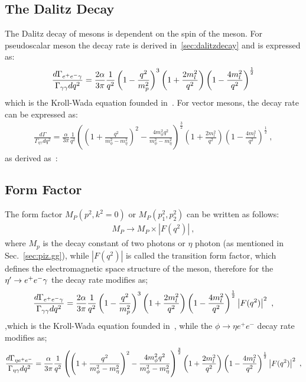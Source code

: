   \subsection{The Dalitz Decay}
  The Dalitz decay of mesons is dependent on the spin of the meson. For pseudoscalar meson the decay rate is derived in~\ref{sec:dalitzdecay} and is expressed as:
  \begin{align}\label{eq:eegff.finalkroll}
  \frac{d\Gamma_{e^+e^- \gamma}}{\Gamma_{\gamma\gamma} dq^2} = \frac{2 \alpha}{3 \pi} \frac{1}{q^2} \left( 1- \frac{q^2}{m_p^2}\right)^3 \left( 1+ \frac{2m_l^2}{q^2}\right) \left( 1- \frac{4m_l^2}{q^2}\right)^{\frac{1}{2}} 
  \end{align}
  which is the Kroll-Wada equation founded in~\cite{KrollWada,landsberg}. For vector mesons, the decay rate can be expressed as:
  \begin{align}
  \frac{d\Gamma}{\Gamma_{\eta\gamma} dq^2} = \frac{\alpha}{3 \pi} \frac{1}{q^2} \left( \left(1+ \frac{q^2}{m_{\phi}^2 - m_{\eta}^2} \right)^2 - \frac{4 m_{\phi}^2 q^2}{m_{\phi}^2 - m_{\eta}^2}\right)^\frac{3}{2} \left( 1+ \frac{2m_l^2}{q^2}\right) \left( 1- \frac{4m_l^2}{q^2}\right)^{\frac{1}{2}} \ ,
  \end{align}
  as derived as~\cite{landsberg}:
  \subsection{Form Factor}
  The form factor ${M}_P(p^2,k^2=0)$ or ${M}_P(p_{1}^2,p_{2}^2)$  can be written as follows:
  \begin{align}
  {M}_P \to {M}_P \times \left|F(q^2)\right| \ ,
  \end{align}
  where $M_p$ is the decay constant of two photons or $\eta$ photon (as mentioned in Sec.~\ref{sec:piz.gg}), while $\left|F(q^2)\right|$ is called the transition form factor, which defines the electromagnetic space structure of the meson, therefore for the $\eta^{\prime} \to e^+e^- \gamma$ the decay rate modifies as;
  \begin{align}\label{eq:eegff.final}
  \frac{d\Gamma_{e^+e^- \gamma}}{\Gamma_{\gamma\gamma} dq^2} = \frac{2 \alpha}{3 \pi} \frac{1}{q^2} \left( 1- \frac{q^2}{m_p^2}\right)^3 \left( 1+ \frac{2m_l^2}{q^2}\right) \left( 1- \frac{4m_l^2}{q^2}\right)^{\frac{1}{2}} \left|F(q^2)\right|^2 \ ,
  \end{align}
  ,which is the Kroll-Wada equation founded in~\cite{KrollWada}, while the $\phi \to \eta e^+e^-$ decay rate modifies as;
  \begin{align}
  \frac{d\Gamma_{\eta e^+e^-}}{\Gamma_{\eta\gamma} dq^2} = \frac{\alpha}{3 \pi} \frac{1}{q^2} \left( \left(1+ \frac{q^2}{m_{\phi}^2 - m_{\eta}^2} \right)^2 - \frac{4 m_{\phi}^2 q^2}{m_{\phi}^2 - m_{\eta}^2}\right)^\frac{3}{2} \left( 1+ \frac{2m_l^2}{q^2}\right) \left( 1- \frac{4m_l^2}{q^2}\right)^{\frac{1}{2}} \left|F(q^2)\right|^2 \ ,
  \end{align}
  
